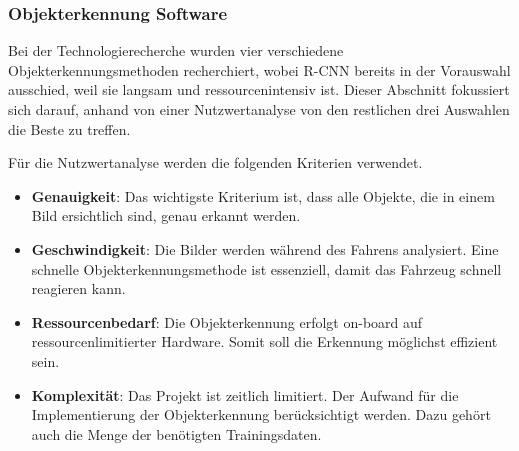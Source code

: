 \documentclass[../main.tex]{subfiles}
\begin{document}
\subsubsection{Objekterkennung Software}


Bei der Technologierecherche wurden vier verschiedene Objekterkennungsmethoden recherchiert, wobei R-CNN bereits in der Vorauswahl ausschied, weil sie langsam und ressourcenintensiv ist.
Dieser Abschnitt fokussiert sich darauf, anhand von einer Nutzwertanalyse von den restlichen drei Auswahlen die Beste zu treffen.

Für die Nutzwertanalyse werden die folgenden Kriterien verwendet.

\begin{itemize}
\item \textbf{Genauigkeit}: Das wichtigste Kriterium ist, dass alle Objekte, die in einem Bild ersichtlich sind, genau erkannt werden.
\item \textbf{Geschwindigkeit}: Die Bilder werden während des Fahrens analysiert. Eine schnelle Objekterkennungsmethode ist essenziell, damit das Fahrzeug schnell reagieren kann.
\item \textbf{Ressourcenbedarf}: Die Objekterkennung erfolgt on-board auf ressourcenlimitierter Hardware. Somit soll die Erkennung möglichst effizient sein.
\item \textbf{Komplexität}: Das Projekt ist zeitlich limitiert. Der Aufwand für die Implementierung der Objekterkennung berücksichtigt werden. Dazu gehört auch die Menge der benötigten Trainingsdaten.
\end{itemize}
\end{document}
